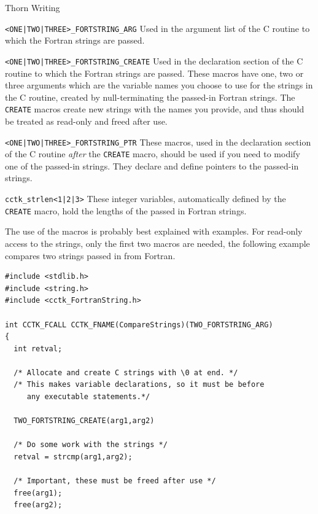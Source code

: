 \begin{cactuspart}{Thorn Writing}
\begin{Lentry}

\item[\texttt{<ONE|TWO|THREE>\_FORTSTRING\_ARG}]
        Used in the argument list of the C routine to which the Fortran
        strings are passed.

\item[\texttt{<ONE|TWO|THREE>\_FORTSTRING\_CREATE}]
        Used in the declaration section of the C routine to which the Fortran
        strings are passed. These macros have one, two or three arguments
        which are the variable names you choose to use for the strings in
        the C routine, created
        by null-terminating the passed-in Fortran strings. The \texttt{CREATE}
        macros create new strings with the names you provide, and thus should
        be treated as read-only and freed after use.

\item[\texttt{<ONE|TWO|THREE>\_FORTSTRING\_PTR}]
        These macros, used in the declaration section of the C routine
        \emph{after} the \texttt{CREATE} macro,
        should be used if you need to modify one of the passed-in strings.
        They declare and define pointers to the passed-in strings.

\item[\texttt{cctk\_strlen<1|2|3>}] These integer variables,
        automatically defined by
        the \texttt{CREATE} macro, hold the lengths of the passed in
        Fortran strings.
\end{Lentry}

The use of the macros is probably best explained with examples.
For read-only access to the strings, only the first two macros are needed,
the following example compares two strings passed in from Fortran.

\begin{verbatim}
#include <stdlib.h>
#include <string.h>
#include <cctk_FortranString.h>

int CCTK_FCALL CCTK_FNAME(CompareStrings)(TWO_FORTSTRING_ARG)
{
  int retval;

  /* Allocate and create C strings with \0 at end. */
  /* This makes variable declarations, so it must be before
     any executable statements.*/

  TWO_FORTSTRING_CREATE(arg1,arg2)

  /* Do some work with the strings */
  retval = strcmp(arg1,arg2);

  /* Important, these must be freed after use */
  free(arg1);
  free(arg2);


\end{verbatim}
\end{cactuspart}
